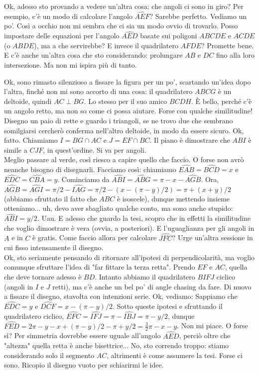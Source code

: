 \begin{sol}
  Ok, adesso sto provando a vedere un'altra cosa: che angoli ci sono in giro? Per esempio, c'è un modo di calcolare l'angolo $\widehat{AEF}$? Sarebbe perfetto. Vediamo un po'. Così a occhio non mi sembra che ci sia un modo ovvio di trovarlo. Posso impostare delle equazioni per l'angolo $\widehat{AED}$ basate sui poligoni $ABCDE$ e $ACDE$ (o $ABDE$), ma a che servirebbe? E invece il quadrilatero $AFDE$? Promette bene. E c'è anche un'altra cosa che sto considerando: prolungare $AB$ e $DC$ fino alla loro intersezione. Ma non mi ispira più di tanto.

  Ok, sono rimasto silenzioso a fissare la figura per un po', scartando un'idea dopo l'altra, finché non mi sono accorto di una cosa: il quadrilatero $ABCG$ è un deltoide, quindi $AC \perp BG$. Lo stesso per il suo amico $BCDH$. È bello, perché c'è un angolo retto, ma non so come ci possa aiutare. Forse con qualche similitudine! Disegno un paio di rette e guardo i triangoli, se ne trovo due che sembrano somilgiarsi cercherò conferma nell'altro deltoide, in modo da essere sicuro. Ok, fatto. Chiamiamo $I=BG \cap AC$ e $J=EF \cap BC$. Il piano è dimostrare che $ABI$ è simile a $CJF$, in quest'ordine. Si va per angoli. \\

  Meglio passare al verde, così riesco a capire quello che faccio. O forse non avrò neanche bisogno di disegnarli. Facciamo così: chiamiamo $\widehat{EAB}=\widehat{BCD}=x$ e $\widehat{EDC}=\widehat{CBA}=y$. Cominciamo da $\widehat{ABI}=\widehat{ABG}=\pi-x-\widehat{AGB}$. Ora, $\widehat{AGB}=\widehat{AGI}=\pi/2-\widehat{IAG}=\pi/2-(x-(\pi-y)/2)=\pi+(x+y)/2$ (abbiamo sfruttato il fatto che $ABC$ è isoscele), dunque mettendo insieme otteniamo...
  uh, devo aver sbagliato qualche conto, ma sono anche stupido: $\widehat{ABI}=y/2$. Uau. E adesso che guardo la tesi, scopro che in effetti la similitudine che voglio dimostrare è vera (ovvia, a posteriori). E l'uguaglianza per gli angoli in $A$ e in $C$ è gratis. Come faccio allora per calcolare $\widehat{JFC}$? Urge un'altra sessione in cui fisso intensamente il disegno. \\

  Ok, sto seriamente pensando di ritornare all'ipotesi di perpendicolarità, ma voglio comunque sfruttare l'idea di "far fittare la terza retta". Prendo $EF$ e $AC$, quella che deve tornare adesso è $BD$. Intanto abbiamo il quadrilatero $BIFJ$ ciclico (angoli in $I$ e $J$ retti), ma c'è anche un bel po' di angle chasing da fare. Di nuovo a fissare il disegno, stavolta con intenzioni serie. Ok, vediamo: Sappiamo che $\widehat{EDC}=y$ e $\widehat{DCF}=x-(\pi-y)/2$. Sotto queste ipotesi e sfruttando il quadrilatero ciclico, $\widehat{EFC}=\widehat{IFJ}=\pi-\widehat{IBJ}=\pi-y/2$, dunque $\widehat{FED}=2\pi-y-x+(\pi-y)/2-\pi+y/2=\frac{3}{2}\pi-x-y$.
  Non mi piace. O forse sì? Per simmetria dovrebbe essere uguale all'angolo $\widehat{AED}$, perciò oltre che "altezza" quella retta è anche bisettrice... No, sto correndo troppo: stiamo considerando solo il segmento $AC$, altrimenti è come assumere la tesi. Forse ci sono. Ricopio il disegno vuoto per schiarirmi le idee.


\end{sol}

